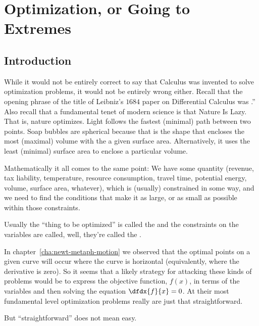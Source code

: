 \chapter{Optimization, or Going to Extremes}
\label{cha:what-deriv-tells}
\section*{Introduction}
\label{sec:introduction}

While it would not be entirely correct to say that Calculus was
invented to solve optimization problems, it would not be entirely
wrong either.  Recall that the opening phrase of the title of
Leibniz's $1684$ paper on Differential Calculus was .'' Also recall that a
fundamental tenet of modern science is that {\sc{}Nature Is
  Lazy}. That is, nature optimizes. Light follows the \alert{fastest}
(minimal) path between two points. Soap bubbles are spherical because
that is the shape that encloses the \alert{most} (maximal) volume with
the a given surface area. Alternatively, it uses the \alert{least}
(minimal) surface area to enclose a particular volume.

Mathematically it all comes to the same point: We have some quantity
(revenue, tax liability, temperature, resource consumption, travel
time, potential energy, volume, surface area, whatever), which is
(usually) constrained in some way, and we need to find the conditions
that make it as large, or as small as possible within those
constraints.

Usually the ``thing to be optimized'' is called the  and the constraints on the variables are called, well,
they're called the .

In chapter~\ref{cha:newt-metaph-motion} we observed that the optimal points on a given curve will occur where the curve is
horizontal (equivalently, where the derivative is zero). So it
seems that a likely strategy for attacking these kinds of problems
would be to express the objective function, $f(x)$,  in terms of the  variables
and then solving the equation $\dfdx{f}{x} = 0$. At their most
fundamental level optimization problems really are just that
straightforward.

But ``straightforward'' does not mean easy.

